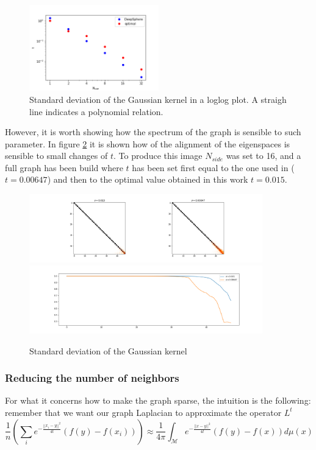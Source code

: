 \begin{figure}[h]
	\label{fig:t}
	\caption{Standard deviation of the Gaussian kernel  in a loglog plot. A straigh line indicates a polynomial relation.}
	\centering
	\includegraphics[width=0.5\textwidth]{../codes/02.HeatKernelGraphLaplacian/HEALPix/06_figures/kernelwidth.png}
\end{figure}

However, it is worth showing how the spectrum of the graph is sensible to such parameter. In figure \ref{fig:t_sensitity} it is shown how of the alignment of the eigenspaces is sensible to small changes of $t$. To produce this image $N_{side}$ was set to 16, and a full graph has been build where $t$ has been set first equal to the one used in \cite{DeepSphere} ($t=0.00647$) and then to the optimal value obtained in this work $t=0.015$.

\begin{figure}[h]
	\label{fig:t_sensitity}
	\caption{Standard deviation of the Gaussian kernel}
	\centering
	\includegraphics[width=0.9\textwidth]{../codes/02.HeatKernelGraphLaplacian/HEALPix/06_figures/t_sensitivity.png}
	\includegraphics[width=0.9\textwidth]{../codes/02.HeatKernelGraphLaplacian/HEALPix/06_figures/t_sensitivity_diagonal.png}
\end{figure}

\subsubsection{Reducing the number of neighbors}
For what it concerns how to make the graph sparse, the intuition is the following: remember that we want our graph Laplacian to approximate the operator $L^t$
$$\frac{1}{n}\left(\sum_i e^{-\frac{||x_i-y||^2}{4t}}(f(y)-f(x_i)) \right) \approx \frac{1}{ 4\pi}\int_\mathcal M e^{-\frac{||x-y||^2}{4t}}\left(f(y)-f(x)\right)d\mu(x) $$


